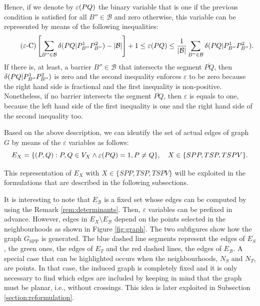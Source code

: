 \documentclass[a4paper,  review, authoryear, 1p.]{elsarticle}
\newcommand{\SPPN}{{\sf{H-SPPN}\xspace }}
\newcommand{\B}{{\mathcal B}}
\newcommand{\EB}{{E^{}_{\mathcal B}}}
\newcommand{\ES}{{E^{}_{S}}}
\newcommand{\ET}{{E^{}_{T}}}
\newcommand{\GSPP}{{G_{\text{SPP}}}}
\newcommand{\segment}[2]{\overline{#1#2}}
\begin{document}
		Hence, if we denote by $\varepsilon(PQ)$ the binary variable that is one if the previous condition is satisfied for all $B''\in\B$ and zero otherwise, this variable can be represented by means of the following inequalities:
		\begin{equation*}\tag{$\varepsilon$-C}\label{eq:varepsilonC}
			\left[\sum_{B''\in\mathcal B}\deltacheck{P}{Q}{P^1_{B''}}{P^2_{B''}}-|\mathcal B|\right] + 1\leq \varepsilonvar{P}{Q}\leq \frac{1}{|\B|}\sum_{B''\in\mathcal B}\deltacheck{P}{Q}{P^1_{B''}}{P^2_{B''}}.
		\end{equation*}
		If there is, at least, a barrier $B''\in\B$ that intersects the segment $\overline{PQ}$, then $\delta(PQ|P^1_{B''}P^2_{B''})$ is zero and the second inequality enforces $\varepsilon$ to be zero because the right hand side is fractional and the first inequality is non-positive. Nonetheless, if no barrier intersects the segment $\segment{P}{Q}$, then $\varepsilon$ is equals to one, because the left hand side of the first inequality is one and the right hand side of the second inequality too. 
		
		Based on the above description, we can identify the set of actual edges of graph $G$ by means of the $\varepsilon$ variables as follows:
		$$ E_X = \{(P, Q):P,Q\in V_X\wedge\varepsilon(PQ)=1, P\neq Q\}, \quad X\in \{SPP,TSP,TSPV\}.$$
		
		This representation of $E_X$ with $X\in \{SPP,TSP,TSPV\}$ will be exploited in the formulations that are described in the following subsections. 
		
		
		It is interesting to note that $\EB$ is a fixed set whose edges can be computed by using the Remark \ref{rem:determinants}. Then, $\varepsilon$ variables can be prefixed in advance. However, edges in $E_X\setminus \EB$ depend on the points selected in the neighbourhoods as shown in Figure \ref{fig:graph}.  The two subfigures show how the graph $\GSPP$ is generated. The blue dashed line segments represent the edges of $\ES$, the green ones, the edges of $\ET$ and the red dashed lines, the edges of $\EB$. A special case that can be highlighted  occurs when the neighbourhoods, $N_S$ and $N_T$, are points. In that case, the induced graph is completely fixed and it is only necessary to find which edges are included by keeping in mind that the graph must be planar, i.e., without crossings. This idea is later exploited in Subsection \ref{section:reformulation}.
		
		
		
\end{document}
